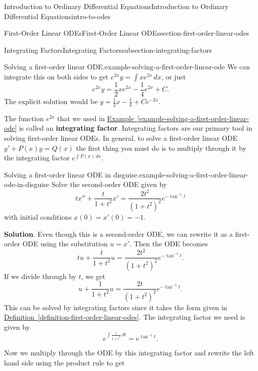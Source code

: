 \documentclass[oneside,10pt,]{book}
\newcommand{\terminology}[1]{\textbf{#1}}
\numberwithin{equation}{section}
\begin{document}
\begin{chapterptx}{Introduction to Ordinary Differential Equations}{}{Introduction to Ordinary Differential Equations}{}{}{intro-to-odes}
\begin{sectionptx}{First-Order Linear ODEs}{}{First-Order Linear ODEs}{}{}{section-first-order-linear-odes}
\begin{subsectionptx}{Integrating Factors}{}{Integrating Factors}{}{}{subsection-integrating-factors}
\begin{example}{Solving a first-order linear ODE.}{example-solving-a-first-order-linear-ode}
We can integrate this on both sides to get \(e^{2x}y = \int xe^{2x}\,dx\), or just%
\begin{equation*}
e^{2x}y = \frac{1}{2}xe^{2x} - \frac{1}{4}e^{2x}+C.
\end{equation*}
The explicit solution would be \(y = \frac{1}{2}x - \frac{1}{4} + Ce^{-2x}\).%
\end{example}
\hypertarget{p-80}{}%
The function \(e^{2x}\) that we used in \hyperref[example-solving-a-first-order-linear-ode]{Example~\ref{example-solving-a-first-order-linear-ode}} is called an \terminology{integrating factor}. Integrating factors are our primary tool in solving first-order linear ODEs. In general, to solve a first-order linear ODE \(y' +P(x)y=Q(x)\) the first thing you must do is to multiply through it by the integrating factor \(e^{\int P(x)\,dx}\).%
\begin{example}{Solving a first-order linear ODE in disguise.}{example-solving-a-first-order-linear-ode-in-disguise}%
\hypertarget{p-81}{}%
Solve the second-order ODE given by%
\begin{equation*}
tx''+\frac{t}{1+t^{2}}x' = \frac{2t^{2}}{(1+t^{2})^{2}}e^{-\tan^{-1}t}
\end{equation*}
with initial conditions \(x(0) = x'(0) = -1.\)%
\par\smallskip%
\noindent\textbf{Solution}.\hypertarget{solution-14}{}\quad%
\hypertarget{p-82}{}%
Even though this is a second-order ODE, we can rewrite it as a first-order ODE using the substitution \(u = x'\). Then the ODE becomes%
\begin{equation*}
tu+\frac{t}{1+t^{2}}u = \frac{2t^{2}}{(1+t^{2})^{2}}e^{-\tan^{-1}t}.
\end{equation*}
If we divide through by \(t\), we get%
\begin{equation*}
u+\frac{1}{1+t^{2}}u = \frac{2t}{(1+t^{2})^{2}}e^{-\tan^{-1}t}.
\end{equation*}
This can be solved by integrating factors since it takes the form given in \hyperref[definition-first-order-linear-odes]{Definition~\ref{definition-first-order-linear-odes}}. The integrating factor we need is given by%
\begin{equation*}
e^{\int \frac{1}{1+t^{2}}\,dt} = e^{\tan^{-1}t}.
\end{equation*}
%
\par
\hypertarget{p-83}{}%
Now we multiply through the ODE by this integrating factor and rewrite the left hand side using the product rule to get%
\begin{equation*}

\end{equation*}
\end{example}
\end{subsectionptx}
\end{sectionptx}
\end{chapterptx}
\end{document}
